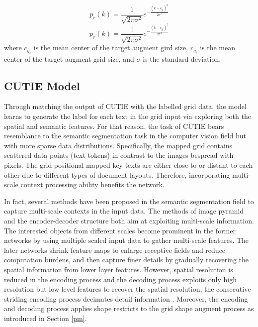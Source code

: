 \documentclass[10pt,twocolumn,letterpaper]{article}
\begin{document}
\begin{equation}
\label{augmentc}
p_c(k) = \frac{1}{\sqrt{2 \pi \sigma^2}} e^{- \frac{(k - c_{g_t})^2}{2 \sigma^2}}
\end{equation}
\begin{equation}
\label{augmentr}
p_r(k) = \frac{1}{\sqrt{2 \pi \sigma^2}} e^{- \frac{(k - r_{g_t})^2}{2 \sigma^2}}
\end{equation}
where $c_{g_t}$ is the mean center of the target augment gird size, $r_{g_t}$ is the mean center of the target augment grid size, and $\sigma$ is the standard deviation.


\subsection{CUTIE Model}
Through matching the output of CUTIE with the labelled grid data, the model learns to generate the label for each text in the grid input via exploring both the spatial and semantic features. For that reason, the task of CUTIE bears resemblance to the semantic segmentation task in the computer vision field but with more sparse data distributions. Specifically, the mapped grid contains scattered data points (text tokens) in contrast to the images bespread with pixels. The grid positional mapped key texts are either close to or distant to each other due to different types of document layouts. Therefore, incorporating multi-scale context processing ability benefits the network.

In fact, several methods have been proposed in the semantic segmentation field to capture multi-scale contexts in the input data. The methods of image pyramid and the encoder-decoder structure both aim at exploiting multi-scale information. The interested objects from different scales become prominent in the former networks by using multiple scaled input data to gather multi-scale features. The later networks shrink feature maps to enlarge receptive fields and reduce computation burdens, and then capture finer details by gradually recovering the spatial information from lower layer features. However, spatial resolution is reduced in the encoding process and the decoding process exploits only high resolution but low level features to recover the spatial resolution, the consecutive striding encoding process decimates detail information \cite{hrnet}. Moreover, the encoding and decoding process applies shape restricts to the grid shape augment process as introduced in Section \ref{pm}. 
\end{document}
